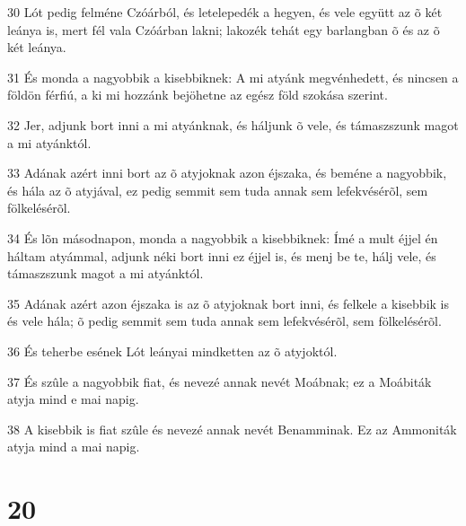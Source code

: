 \par 30 Lót pedig felméne Czóárból, és letelepedék a hegyen, és vele együtt az õ két leánya is, mert fél vala Czóárban lakni; lakozék tehát egy barlangban õ és az õ két leánya.
\par 31 És monda a nagyobbik a kisebbiknek: A mi atyánk megvénhedett, és nincsen a földön férfiú, a ki mi hozzánk bejöhetne az egész föld szokása szerint.
\par 32 Jer, adjunk bort inni a mi atyánknak, és háljunk õ vele, és támaszszunk magot a mi atyánktól.
\par 33 Adának azért inni bort az õ atyjoknak azon éjszaka, és beméne a nagyobbik, és hála az õ atyjával, ez pedig semmit sem tuda annak sem lefekvésérõl, sem fölkelésérõl.
\par 34 És lõn másodnapon, monda a nagyobbik a kisebbiknek: Ímé a mult éjjel én háltam atyámmal, adjunk néki bort inni ez éjjel is, és menj be te, hálj vele, és támaszszunk magot a mi atyánktól.
\par 35 Adának azért azon éjszaka is az õ atyjoknak bort inni, és felkele a kisebbik is és vele hála; õ pedig semmit sem tuda annak sem lefekvésérõl, sem fölkelésérõl.
\par 36 És teherbe esének Lót leányai mindketten az õ atyjoktól.
\par 37 És szûle a nagyobbik fiat, és nevezé annak nevét Moábnak; ez a Moábiták atyja mind e mai napig.
\par 38 A kisebbik is fiat szûle és nevezé annak nevét Benamminak. Ez az Ammoniták atyja mind a mai napig.

\chapter{20}


